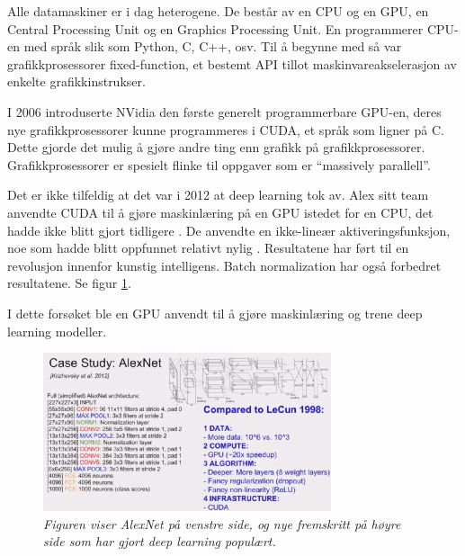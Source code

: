Alle datamaskiner er i dag heterogene. De består av en CPU og en GPU, en Central Processing Unit og en Graphics Processing Unit. En programmerer CPU-en med språk slik som Python, C, C++, osv. Til å begynne med så var grafikkprosessorer fixed-function, et bestemt API tillot maskinvareakselerasjon av enkelte grafikkinstrukser. \cite{Buck 2006 s. 5}

I 2006 introduserte NVidia den første generelt programmerbare GPU-en, deres nye grafikkprosessorer kunne programmeres i CUDA, et språk som ligner på C. Dette gjorde det mulig å gjøre andre ting enn grafikk på grafikkprosessorer. Grafikkprosessorer er spesielt flinke til oppgaver som er ``massively parallell''. \cite{Buck 2006 s. 1} %

Det er ikke tilfeldig at det var i 2012 at deep learning tok av. Alex sitt team anvendte CUDA til å gjøre maskinlæring på en GPU istedet for en CPU, det hadde ikke blitt gjort tidligere \cite{Krizhevsky m.fl. 2012}. De anvendte en ikke-lineær aktiveringsfunksjon, noe som hadde blitt oppfunnet relativt nylig \cite{LeCun m.fl. 1998 s. 3}. Resultatene har ført til en revolusjon innenfor kunstig intelligens. Batch normalization har også forbedret resultatene. Se figur \ref{fig:comparison}. \cite{Ioffe og Szegedy 2015 s. 1}

I dette forsøket ble en GPU anvendt til å gjøre maskinlæring og trene deep learning modeller.

\begin{figure} 
\begin{center} 
\includegraphics[scale=1.0]{figures/comparison}
\caption{\small \sl Figuren viser AlexNet på venstre side, og nye fremskritt på høyre side som har gjort deep learning populært. \cite{Karpathy 2014} \label{fig:comparison}}
\end{center} 
\end{figure} 

